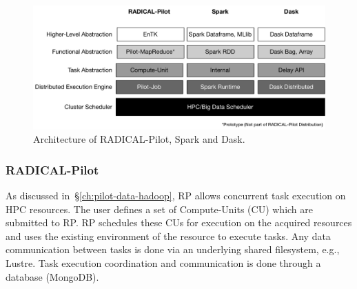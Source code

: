 \begin{figure}[t]
    \centering
    \includegraphics[width=.95\textwidth]{figures/data_analytics_hpc/task_par/bigdata_framework_stack.pdf}
    \caption{Architecture of RADICAL-Pilot, Spark and Dask.}
    \label{fig:figures_bigdata_framework_stack}
\end{figure}

\subsubsection*{RADICAL-Pilot}


As discussed in~\S\ref{ch:pilot-data-hadoop}, RP allows concurrent
task execution on HPC resources. The user defines a set of Compute-Units (CU)
which are submitted to RP. RP schedules these CUs for
execution on the acquired resources and uses the existing environment of the
resource to execute tasks. Any data communication between tasks is done via an
underlying shared filesystem, e.g., Lustre. Task execution coordination and
communication is done through a database (MongoDB).

